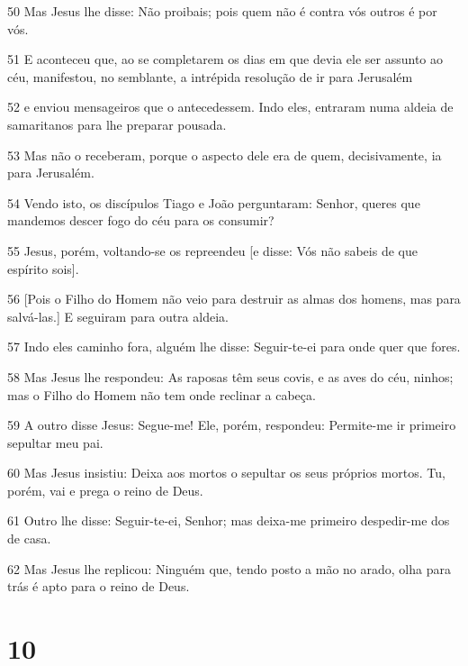 \par 50 Mas Jesus lhe disse: Não proibais; pois quem não é contra vós outros é por vós.
\par 51 E aconteceu que, ao se completarem os dias em que devia ele ser assunto ao céu, manifestou, no semblante, a intrépida resolução de ir para Jerusalém
\par 52 e enviou mensageiros que o antecedessem. Indo eles, entraram numa aldeia de samaritanos para lhe preparar pousada.
\par 53 Mas não o receberam, porque o aspecto dele era de quem, decisivamente, ia para Jerusalém.
\par 54 Vendo isto, os discípulos Tiago e João perguntaram: Senhor, queres que mandemos descer fogo do céu para os consumir?
\par 55 Jesus, porém, voltando-se os repreendeu [e disse: Vós não sabeis de que espírito sois].
\par 56 [Pois o Filho do Homem não veio para destruir as almas dos homens, mas para salvá-las.] E seguiram para outra aldeia.
\par 57 Indo eles caminho fora, alguém lhe disse: Seguir-te-ei para onde quer que fores.
\par 58 Mas Jesus lhe respondeu: As raposas têm seus covis, e as aves do céu, ninhos; mas o Filho do Homem não tem onde reclinar a cabeça.
\par 59 A outro disse Jesus: Segue-me! Ele, porém, respondeu: Permite-me ir primeiro sepultar meu pai.
\par 60 Mas Jesus insistiu: Deixa aos mortos o sepultar os seus próprios mortos. Tu, porém, vai e prega o reino de Deus.
\par 61 Outro lhe disse: Seguir-te-ei, Senhor; mas deixa-me primeiro despedir-me dos de casa.
\par 62 Mas Jesus lhe replicou: Ninguém que, tendo posto a mão no arado, olha para trás é apto para o reino de Deus.

\chapter{10}

